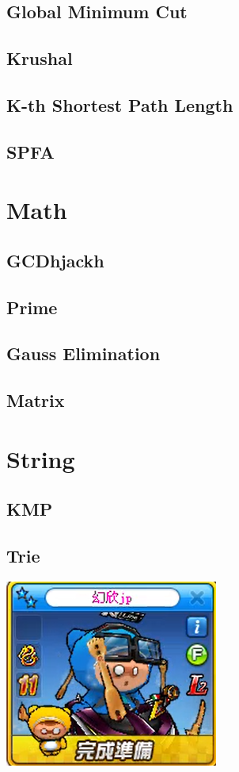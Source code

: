     \subsection{Global Minimum Cut}
        
    \subsection{Krushal}
        
    \subsection{K-th Shortest Path Length}
        
    \subsection{SPFA}
        

\section{Math}
    \subsection{GCDhjackh}
        
    \subsection{Prime}
        
    \subsection{Gauss Elimination}
        
    \subsection{Matrix}
        
        
\section{String}
    \subsection{KMP}
        
    \subsection{Trie}
        
\includegraphics{Contents/runrun.png}